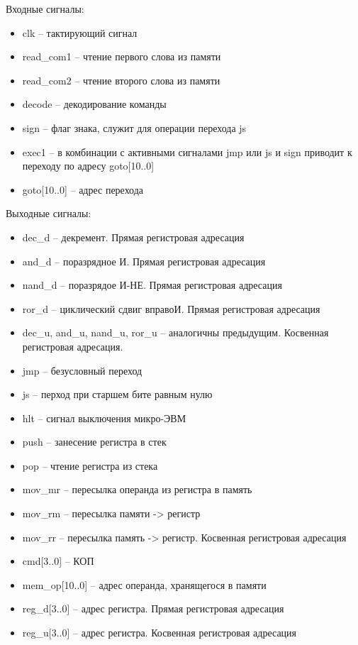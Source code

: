 Входные сигналы:
\begin{itemize}
    \item clk -- тактирующий сигнал
    \item read\_com1 -- чтение первого слова из памяти
    \item read\_com2 -- чтение второго слова из памяти
    \item decode -- декодирование команды
    \item sign -- флаг знака, служит для операции перехода js
    \item exec1 -- в комбинации с активными сигналами jmp или js и sign приводит к переходу по адресу goto[10..0]
    \item goto[10..0] -- адрес перехода
\end{itemize}
Выходные сигналы:
\begin{itemize}
    \item dec\_d -- декремент. Прямая регистровая адресация
    \item and\_d -- поразрядное И. Прямая регистровая адресация
    \item nand\_d -- поразрядое И-НЕ. Прямая регистровая адресация
    \item ror\_d -- циклический сдвиг вправоИ. Прямая регистровая адресация
    \item dec\_u, and\_u, nand\_u, ror\_u -- аналогичны предыдущим. Косвенная регистровая адресация.
    \item jmp -- безусловный переход
    \item js -- перход при старшем бите равным нулю
    \item hlt -- сигнал выключения микро-ЭВМ
    \item push -- занесение регистра в стек
    \item pop -- чтение регистра из стека
    \item mov\_mr -- пересылка операнда из регистра в память
    \item mov\_rm -- пересылка памяти -> регистр
    \item mov\_rr -- пересылка память -> регистр. Косвенная регистровая адресация
    \item cmd[3..0] -- КОП
    \item mem\_op[10..0] -- адрес операнда, хранящегося в памяти
    \item reg\_d[3..0] -- адрес регистра. Прямая регистровая адресация
    \item reg\_u[3..0] -- адрес регистра. Косвенная регистровая адресация
\end{itemize}

